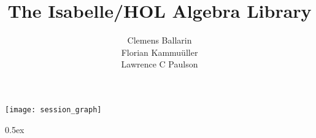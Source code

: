 \documentclass[11pt,a4paper]{article}
\begin{document}
\title{The Isabelle/HOL Algebra Library}
\author{
  Clemens Ballarin \\
  Florian Kammu\"uller \\
  Lawrence C Paulson \\
}
\maketitle

\tableofcontents

\begin{center}
  \texttt{[image: session\_graph]}
\end{center}

\clearpage

\renewcommand{\isamarkupheader}[1]%
{\section{\isabellecontext: #1}\markright{THEORY~``\isabellecontext''}}

\parindent 0pt\parskip 0.5ex


\pagestyle{headings}


\end{document}
